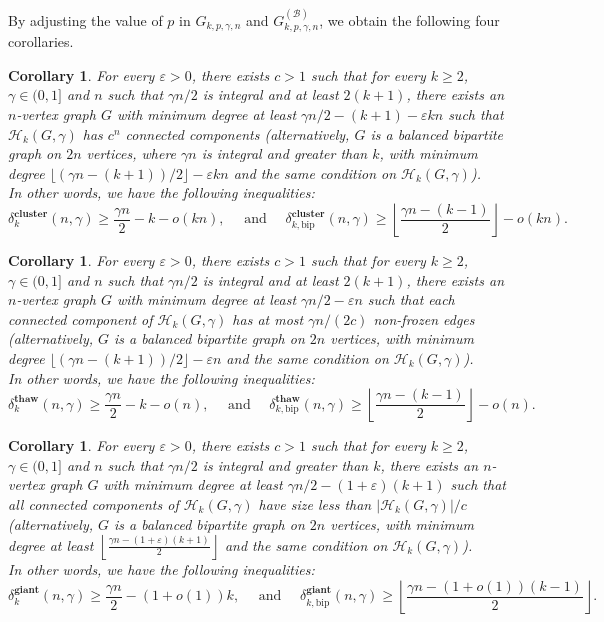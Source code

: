 \documentclass[11pt,a4paper]{article}
\newtheorem{corollary}[theorem]{Corollary}
\theoremstyle{definition}
\newcommand{\eps}{\varepsilon}
\begin{document}
By adjusting the value of
$p$ in $G_{k,p,\gamma,n}$ and $G_{k,p,\gamma,n}^{(\mathcal B)}$, we obtain the following four corollaries.
\begin{corollary}\label{cor:clustering}
  For every $\eps > 0$, there exists $c>1$ such that for every $k \ge 2$, $\gamma \in (0,1]$ and $n$ such that $\gamma n/2$ is integral and at least $2(k+1)$, there exists an $n$-vertex graph $G$ with minimum degree at least $\gamma n/2 - (k+1) - \eps k n$ such that $\mathcal{H}_{k}(G,\gamma)$ has $c^n$ connected components (alternatively, $G$ is a balanced bipartite graph on $2n$ vertices, where $\gamma n$ is integral and greater than $k$, with minimum degree $\lfloor(\gamma n - (k+1))/2\rfloor - \eps k n$ and the same condition on $\mathcal{H}_{k}(G,\gamma)$).\\ 
  In other words, we have the following inequalities:
  \[
  \delta^{\mathbf{cluster}}_k(n,\gamma)\ge \frac{\gamma n}2 - k - o(kn),
  \quad \text{ and } \quad
  \delta^{\mathbf{cluster}}_{k,\mathrm{bip}}(n,\gamma)\ge\left\lfloor\frac{\gamma n - (k-1)}2\right\rfloor- o(kn).
  \]
\end{corollary}

\begin{corollary}\label{cor:freezing}
   For every $\eps > 0$, there exists $c>1$ such that for every $k \ge 2$, $\gamma \in (0,1]$ and $n$ such that $\gamma n/2$ is integral and at least $2(k+1)$, there exists an $n$-vertex graph $G$ with minimum degree at least $\gamma n/2 - \eps n$ such that each connected component of $\mathcal{H}_{k}(G,\gamma)$ has at most $\gamma n/(2c)$ non-frozen edges (alternatively, $G$ is a balanced bipartite graph on $2n$ vertices, with minimum degree $\lfloor(\gamma n - (k+1))/2\rfloor - \eps n$ and the same condition on $\mathcal{H}_{k}(G,\gamma)$).\\ 
  In other words, we have the following inequalities:
  \[
  \delta^{\mathbf{thaw}}_k(n,\gamma)\ge \frac{\gamma n}2 - k - o(n),
  \quad \text{ and } \quad
  \delta^{\mathbf{thaw}}_{k,\mathrm{bip}}(n,\gamma) \ge \left\lfloor\frac{\gamma n - (k-1)}2\right\rfloor- o(n).
  \]
\end{corollary}

\begin{corollary}\label{cor:giant}
   For every $\eps > 0$, there exists $c>1$ such that for every $k \ge 2$, $\gamma \in (0,1]$ and $n$ such that $\gamma n/2$ is integral and greater than $k$, there exists an $n$-vertex graph $G$ with minimum degree at least $\gamma n/2 - (1+\eps)(k+1)$ such that all connected components of $\mathcal{H}_{k}(G,\gamma)$ have size less than $|\mathcal{H}_{k}(G,\gamma)|/c$ (alternatively, $G$ is a balanced bipartite graph on $2n$ vertices, with minimum degree at least $\left\lfloor \frac{\gamma n - (1+\eps)(k+1)}2 \right\rfloor$ and the same condition on $\mathcal{H}_{k}(G,\gamma)$).\\ 
  In other words, we have the following inequalities:
  \[
  \delta^{\mathbf{giant}}_k(n,\gamma)\ge\frac{\gamma n}2-(1+o(1))k,  
  \quad \text{ and } \quad
  \delta^{\mathbf{giant}}_{k,\mathrm{bip}}(n,\gamma)\ge\left\lfloor\frac{\gamma n-(1+o(1))(k-1)}2\right\rfloor.
  \]
\end{corollary}
\end{document}

